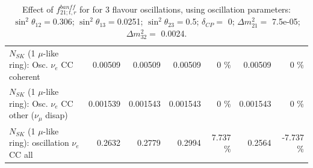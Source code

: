 \begin{table}
\begin{tabular}{| l | r | r | r  r | r  r |}
                          $N_{SK}$ (1 $\mu$-like ring): Osc. $\nu_e$ CC coherent &         0.00509 &         0.00509 &         0.00509 &        0 \%  &         0.00509 &        0 \%  \\ 
           $N_{SK}$ (1 $\mu$-like ring): Osc. $\nu_e$ CC other ($\nu_\mu$ disap) &        0.001539 &        0.001543 &        0.001543 &        0 \%  &        0.001543 &        0 \%  \\ 
                        $N_{SK}$ (1 $\mu$-like ring): oscillation $\nu_e$ CC all &          0.2632 &          0.2779 &          0.2994 &    7.737 \%  &          0.2564 &   -7.737 \%  \\ 
\hline
\hline
\end{tabular}
\caption{ Effect of $f_{21; t, r}^{banff}$ for for 3 flavour oscillations, using oscillation parameters:  $\sin^2\theta_{12} = $0.306; $\sin^2\theta_{13} = $0.0251; $\sin^2\theta_{23} = $0.5; $\delta_{CP} = $        0; $\Delta m^2_{21} = $    7.5e-05; $\Delta m^2_{32} = $    0.0024. }
\label{tab:num_banff_cc1piE0_1RmuT_3f_osc_t13:0.0251}
\end{table}
\clearpage
